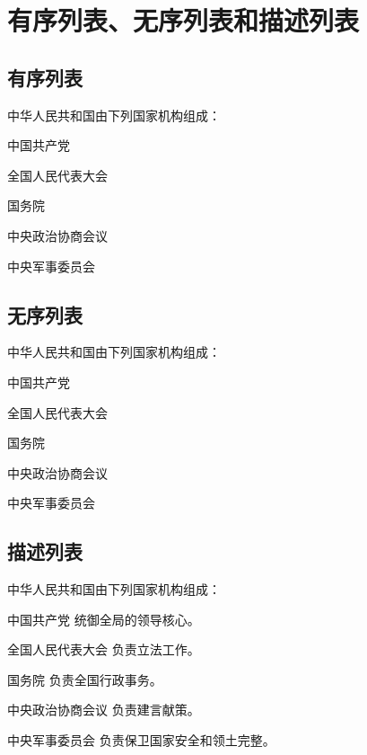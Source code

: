 \section{有序列表、无序列表和描述列表}

\subsection{有序列表}

中华人民共和国由下列国家机构组成：

\begin{Enumerate}
\item {中国共产党}
\item {全国人民代表大会}
\item {国务院}
\item {中央政治协商会议}
\item {中央军事委员会}
\end{Enumerate}

\subsection{无序列表}

中华人民共和国由下列国家机构组成：

\begin{Itemize}
\item {中国共产党}
\item {全国人民代表大会}
\item {国务院}
\item {中央政治协商会议}
\item {中央军事委员会}
\end{Itemize}

\subsection{描述列表}

中华人民共和国由下列国家机构组成：

\begin{Description}[12em]
\item[中国共产党] {统御全局的领导核心。}
\item[全国人民代表大会] {负责立法工作。}
\item[国务院] {负责全国行政事务。}
\item[中央政治协商会议] {负责建言献策。}
\item[中央军事委员会] {负责保卫国家安全和领土完整。}
\end{Description}
